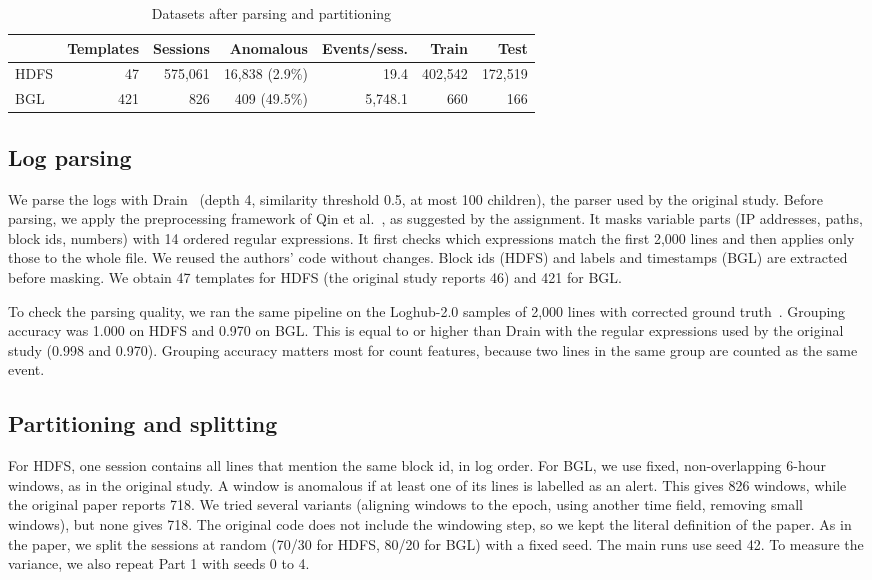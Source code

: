 \documentclass[10pt, conference]{IEEEtran}
\begin{document}
\begin{table}[t]
\centering
\caption{Datasets after parsing and partitioning}
\label{tab:data}
\footnotesize
\setlength{\tabcolsep}{2.2pt}
\begin{tabular}{lrrrrrr}
\toprule
 & Templates & Sessions & Anomalous & Events/sess. & Train & Test \\
\midrule
HDFS & 47 & 575,061 & 16,838 (2.9\%) & 19.4 & 402,542 & 172,519 \\
BGL & 421 & 826 & 409 (49.5\%) & 5,748.1 & 660 & 166 \\
\bottomrule
\end{tabular}
\end{table}

\subsection{Log parsing}

We parse the logs with Drain~\cite{he2017drain} (depth 4, similarity threshold 0.5, at most 100 children), the parser used by the original study. Before parsing, we apply the preprocessing framework of Qin et al.~\cite{qin2025preprocessing}, as suggested by the assignment. It masks variable parts (IP addresses, paths, block ids, numbers) with 14 ordered regular expressions. It first checks which expressions match the first 2,000 lines and then applies only those to the whole file. We reused the authors' code without changes. Block ids (HDFS) and labels and timestamps (BGL) are extracted before masking. We obtain 47 templates for HDFS (the original study reports 46) and 421 for BGL.

To check the parsing quality, we ran the same pipeline on the Loghub-2.0 samples of 2,000 lines with corrected ground truth~\cite{jiang2024loghub2}. Grouping accuracy was 1.000 on HDFS and 0.970 on BGL. This is equal to or higher than Drain with the regular expressions used by the original study (0.998 and 0.970). Grouping accuracy matters most for count features, because two lines in the same group are counted as the same event.

\subsection{Partitioning and splitting}

For HDFS, one session contains all lines that mention the same block id, in log order. For BGL, we use fixed, non-overlapping 6-hour windows, as in the original study. A window is anomalous if at least one of its lines is labelled as an alert. This gives 826 windows, while the original paper reports 718. We tried several variants (aligning windows to the epoch, using another time field, removing small windows), but none gives 718. The original code does not include the windowing step, so we kept the literal definition of the paper. As in the paper, we split the sessions at random (70/30 for HDFS, 80/20 for BGL) with a fixed seed. The main runs use seed 42. To measure the variance, we also repeat Part 1 with seeds 0 to 4.
\end{document}
